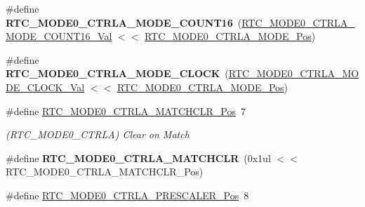 \begin{DoxyCompactItemize}
\item 
\hypertarget{group___s_a_m_l21___r_t_c_gad92751b235c534e5ba1d56d4637fda7c}{}\#define {\bfseries R\+T\+C\+\_\+\+M\+O\+D\+E0\+\_\+\+C\+T\+R\+L\+A\+\_\+\+M\+O\+D\+E\+\_\+\+C\+O\+U\+N\+T16}~(\hyperlink{group___s_a_m_l21___r_t_c_ga8a10d7200f84743b92062578a08b92b1}{R\+T\+C\+\_\+\+M\+O\+D\+E0\+\_\+\+C\+T\+R\+L\+A\+\_\+\+M\+O\+D\+E\+\_\+\+C\+O\+U\+N\+T16\+\_\+\+Val} $<$$<$ \hyperlink{group___s_a_m_l21___r_t_c_ga2f001f07dca26979505852573f1bb701}{R\+T\+C\+\_\+\+M\+O\+D\+E0\+\_\+\+C\+T\+R\+L\+A\+\_\+\+M\+O\+D\+E\+\_\+\+Pos})\label{group___s_a_m_l21___r_t_c_gad92751b235c534e5ba1d56d4637fda7c}

\item 
\hypertarget{group___s_a_m_l21___r_t_c_ga8c04154d4e4fe7707f15f0923ccd79ac}{}\#define {\bfseries R\+T\+C\+\_\+\+M\+O\+D\+E0\+\_\+\+C\+T\+R\+L\+A\+\_\+\+M\+O\+D\+E\+\_\+\+C\+L\+O\+C\+K}~(\hyperlink{group___s_a_m_l21___r_t_c_gabcfe026e99e9b79b5bcf463788a1c8a3}{R\+T\+C\+\_\+\+M\+O\+D\+E0\+\_\+\+C\+T\+R\+L\+A\+\_\+\+M\+O\+D\+E\+\_\+\+C\+L\+O\+C\+K\+\_\+\+Val} $<$$<$ \hyperlink{group___s_a_m_l21___r_t_c_ga2f001f07dca26979505852573f1bb701}{R\+T\+C\+\_\+\+M\+O\+D\+E0\+\_\+\+C\+T\+R\+L\+A\+\_\+\+M\+O\+D\+E\+\_\+\+Pos})\label{group___s_a_m_l21___r_t_c_ga8c04154d4e4fe7707f15f0923ccd79ac}

\item 
\hypertarget{group___s_a_m_l21___r_t_c_ga899c485d4de3fa775c3b9c8154ea57d9}{}\#define \hyperlink{group___s_a_m_l21___r_t_c_ga899c485d4de3fa775c3b9c8154ea57d9}{R\+T\+C\+\_\+\+M\+O\+D\+E0\+\_\+\+C\+T\+R\+L\+A\+\_\+\+M\+A\+T\+C\+H\+C\+L\+R\+\_\+\+Pos}~7\label{group___s_a_m_l21___r_t_c_ga899c485d4de3fa775c3b9c8154ea57d9}

\begin{DoxyCompactList}\small\item\em (R\+T\+C\+\_\+\+M\+O\+D\+E0\+\_\+\+C\+T\+R\+L\+A) Clear on Match \end{DoxyCompactList}\item 
\hypertarget{group___s_a_m_l21___r_t_c_ga1023bec6649d1468a3c0b107ceddd64d}{}\#define {\bfseries R\+T\+C\+\_\+\+M\+O\+D\+E0\+\_\+\+C\+T\+R\+L\+A\+\_\+\+M\+A\+T\+C\+H\+C\+L\+R}~(0x1ul $<$$<$ R\+T\+C\+\_\+\+M\+O\+D\+E0\+\_\+\+C\+T\+R\+L\+A\+\_\+\+M\+A\+T\+C\+H\+C\+L\+R\+\_\+\+Pos)\label{group___s_a_m_l21___r_t_c_ga1023bec6649d1468a3c0b107ceddd64d}

\item 
\hypertarget{group___s_a_m_l21___r_t_c_ga0dbb76324e6c9c6d9391c96723e6e59b}{}\#define \hyperlink{group___s_a_m_l21___r_t_c_ga0dbb76324e6c9c6d9391c96723e6e59b}{R\+T\+C\+\_\+\+M\+O\+D\+E0\+\_\+\+C\+T\+R\+L\+A\+\_\+\+P\+R\+E\+S\+C\+A\+L\+E\+R\+\_\+\+Pos}~8\label{group___s_a_m_l21___r_t_c_ga0dbb76324e6c9c6d9391c96723e6e59b}


\end{DoxyCompactItemize}
